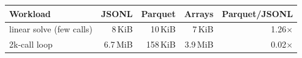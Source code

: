 \begin{tabular}{lrrrr}
\toprule
Workload & JSONL & Parquet & Arrays & Parquet/JSONL \\
\midrule
linear solve (few calls) & 8\,KiB & 10\,KiB & 7\,KiB & 1.26$\times$ \\
2k-call loop & 6.7\,MiB & 158\,KiB & 3.9\,MiB & 0.02$\times$ \\
\bottomrule
\end{tabular}
